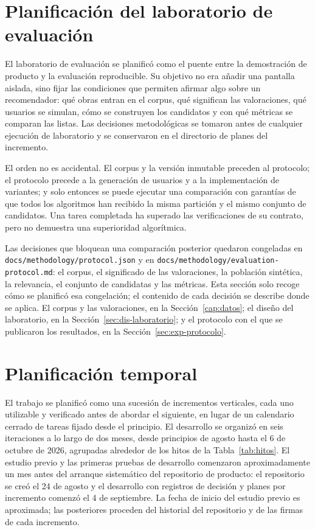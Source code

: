 \section{Planificación del laboratorio de evaluación}\label{sec:met-fase2}

El laboratorio de evaluación se planificó como el puente entre la demostración de producto y la evaluación
reproducible. Su objetivo no era añadir una pantalla aislada, sino fijar las condiciones que
permiten afirmar algo sobre un recomendador: qué obras entran en el corpus, qué significan
las valoraciones, qué usuarios se simulan, cómo se construyen los candidatos y con qué
métricas se comparan las listas. Las decisiones metodológicas se tomaron antes de cualquier
ejecución de laboratorio y se conservaron en el directorio de planes del incremento.

El orden no es accidental. El corpus y la versión inmutable preceden al protocolo; el protocolo
precede a la generación de usuarios y a la implementación de variantes; y solo entonces se
puede ejecutar una comparación con garantías de que todos los algoritmos han recibido la
misma partición y el mismo conjunto de candidatos. Una tarea completada ha superado las
verificaciones de su contrato, pero no demuestra una superioridad algorítmica.

Las decisiones que bloquean una comparación posterior quedaron congeladas en
\texttt{docs/methodology/protocol.json} y en \texttt{docs/methodology/evaluation-protocol.md}:
el corpus, el significado de las valoraciones, la población sintética, la relevancia, el
conjunto de candidatas y las métricas. Esta sección solo recoge cómo se planificó esa
congelación; el contenido de cada decisión se describe donde se aplica. El corpus y las
valoraciones, en la Sección~\ref{cap:datos}; el diseño del laboratorio, en la
Sección~\ref{sec:dis-laboratorio}; y el protocolo con el que se publicaron los resultados, en
la Sección~\ref{sec:exp-protocolo}.

\section{Planificación temporal}\label{sec:met-temporal}

El trabajo se planificó como una sucesión de incrementos verticales, cada uno utilizable y
verificado antes de abordar el siguiente, en lugar de un calendario cerrado de tareas fijado
desde el principio. El desarrollo se organizó en seis iteraciones a lo largo de dos meses,
desde principios de agosto hasta el 6 de octubre de 2026, agrupadas alrededor de los hitos de la
Tabla~\ref{tab:hitos}. El estudio previo y las primeras pruebas de desarrollo comenzaron
aproximadamente un mes antes del arranque sistemático del repositorio de producto: el
repositorio se creó el 24 de agosto y el desarrollo con registros de decisión y planes por
incremento comenzó el 4 de septiembre. La fecha de inicio del estudio previo es aproximada; las
posteriores proceden del historial del repositorio y de las firmas de cada incremento.

